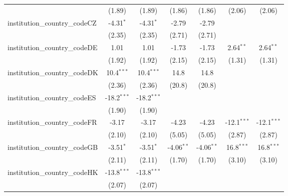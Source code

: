 \begin{tabular}{lcccccc}
                                         & (1.89)        & (1.89)        & (1.86)        & (1.86)        & (2.06)        & (2.06)\\   
   institution\_country\_codeCZ          & -4.31$^{*}$   & -4.31$^{*}$   & -2.79         & -2.79         &               &   \\   
                                         & (2.35)        & (2.35)        & (2.71)        & (2.71)        &               &   \\   
   institution\_country\_codeDE          & 1.01          & 1.01          & -1.73         & -1.73         & 2.64$^{**}$   & 2.64$^{**}$\\   
                                         & (1.92)        & (1.92)        & (2.15)        & (2.15)        & (1.31)        & (1.31)\\   
   institution\_country\_codeDK          & 10.4$^{***}$  & 10.4$^{***}$  & 14.8          & 14.8          &               &   \\   
                                         & (2.36)        & (2.36)        & (20.8)        & (20.8)        &               &   \\   
   institution\_country\_codeES          & -18.2$^{***}$ & -18.2$^{***}$ &               &               &               &   \\   
                                         & (1.90)        & (1.90)        &               &               &               &   \\   
   institution\_country\_codeFR          & -3.17         & -3.17         & -4.23         & -4.23         & -12.1$^{***}$ & -12.1$^{***}$\\   
                                         & (2.10)        & (2.10)        & (5.05)        & (5.05)        & (2.87)        & (2.87)\\   
   institution\_country\_codeGB          & -3.51$^{*}$   & -3.51$^{*}$   & -4.06$^{**}$  & -4.06$^{**}$  & 16.8$^{***}$  & 16.8$^{***}$\\   
                                         & (2.11)        & (2.11)        & (1.70)        & (1.70)        & (3.10)        & (3.10)\\   
   institution\_country\_codeHK          & -13.8$^{***}$ & -13.8$^{***}$ &               &               &               &   \\   
                                         & (2.07)        & (2.07)        &               &               &               &   \\   

\end{tabular}
